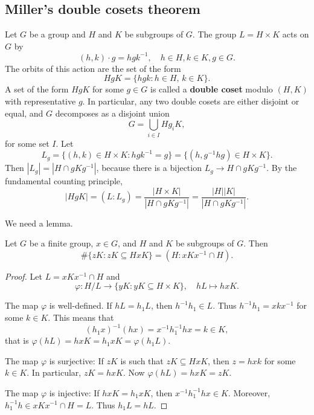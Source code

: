 


\subsection{Miller's double cosets theorem}

Let $G$ be a group and $H$ and $K$ be subgroups of $G$. 
The group $L=H\times K$ acts on $G$ by
\[
(h,k)\cdot g=hgk^{-1},\quad h\in H,k\in K,g\in G.
\]
The orbits of this action are the set of the form 
\[
HgK=\{hgk:h\in H,\,k\in K\}.
\]
A set of the form $HgK$ for some $g\in G$ is called a \textbf{double coset} modulo $(H,K)$ 
with representative $g$. In particular, 
any two double cosets are either disjoint or equal, and $G$ decomposes
as a disjoint union 
\[
G=\bigcup_{i\in I}Hg_iK,
\]
for some set $I$. Let 
\[
L_g=\{(h,k)\in H\times K:hgk^{-1}=g\}=\{(h,g^{-1}hg)\in H\times K\}.
\]
Then
$|L_g|=|H\cap gKg^{-1}|$, 
because there is a bijection $L_g\to H\cap gKg^{-1}$.  
By the fundamental counting principle, 
\[
|HgK|=(L:L_g)=\frac{|H\times K|}{|H\cap gKg^{-1}|}=\frac{|H||K|}{|H\cap gKg^{-1}|}.
\]

We need a lemma. 

\begin{lemma}
\label{lem:Miller}
    Let $G$ be a finite group, $x\in G$, and $H$ and $K$ be subgroups of $G$. Then
    \[
    \#\{zK:zK\subseteq HxK\}=(H:xKx^{-1}\cap H).
    \]
\end{lemma}

\begin{proof}
    Let $L=xKx^{-1}\cap H$ and 
    \[
    \varphi\colon H/L\to\{yK:yK\subseteq H\times K\},\quad 
    hL\mapsto hxK.
    \]

    The map $\varphi$ is well-defined. If $hL=h_1L$, then $h^{-1}h_1\in L$. Thus 
    $h^{-1}h_1=xkx^{-1}$ for some $k\in K$. This means that
    \[
    (h_1x)^{-1}(hx)=x^{-1}h_1^{-1}hx=k\in K,
    \]
    that is $\varphi(hL)=hxK=h_1xK=\varphi(h_1L)$. 

    The map $\varphi$ is surjective: If $zK$ is such that $zK\subseteq HxK$, then 
    $z=hxk$ for some $k\in K$. In particular, 
    $zK=hxK$. Now $\varphi(hL)=hxK=zK$.

    The map $\varphi$ is injective: If $hxK=h_1xK$, then 
    $x^{-1}h_1^{-1}hx\in K$. Moreover, 
    $h_1^{-1}h\in xKx^{-1}\cap H=L$. Thus $h_1L=hL$. 
\end{proof}


